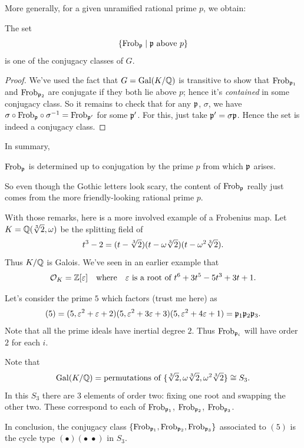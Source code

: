 More generally, for a given unramified rational prime $p$, we obtain:
\begin{theorem}
	The set
	\[ \left\{ \mathrm{Frob}_\mathfrak p \mid \mathfrak p \text{ above } p \right\} \]
	is one of the conjugacy classes of $G$.
\end{theorem}
\begin{proof}
	We've used the fact that $G = \operatorname{Gal}(K/\mathbb Q)$ is transitive
	to show that $\mathrm{Frob}_{\mathfrak p_1}$ and $\mathrm{Frob}_{\mathfrak p_2}$ are conjugate
	if they both lie above $p$; hence it's \emph{contained} in some
	conjugacy class.
	So it remains to check that for any $\mathfrak p$, $\sigma$,
	we have $\sigma \circ \mathrm{Frob}_\mathfrak p \circ \sigma^{-1} = \mathrm{Frob}_{\mathfrak p'}$
	for some $\mathfrak p'$. For this, just take $\mathfrak p' = \sigma\mathfrak p$.
	Hence the set is indeed a conjugacy class.
\end{proof}

In summary,
\begin{moral}
	$\mathrm{Frob}_{\mathfrak p}$ is determined up to conjugation by the prime $p$
	from which $\mathfrak p$ arises.
\end{moral}
So even though the Gothic letters look scary, the content of $\mathrm{Frob}_{\mathfrak p}$
really just comes from the more friendly-looking rational prime $p$.


\begin{example}
	With those remarks, here is a more involved example of a Frobenius map.
	Let $K = \mathbb Q(\sqrt[3]{2}, \omega)$ be the splitting field of
	\[ t^3-2 = (t-\sqrt[3]{2})(t-\omega\sqrt[3]{2})(t-\omega^2\sqrt[3]{2}). \]
	Thus $K/\mathbb Q$ is Galois.
	We've seen in an earlier example that
	\[ \mathcal O_K = \mathbb Z[\varepsilon] \quad\text{where}\quad \varepsilon \text { is a root of } t^6+3t^5-5t^3+3t+1. \]

	Let's consider the prime $5$ which factors (trust me here) as
	\[ (5) = (5, \varepsilon^2+\varepsilon+2)(5, \varepsilon^2+3\varepsilon+3)(5, \varepsilon^2+4\varepsilon+1)
		= \mathfrak p_1 \mathfrak p_2 \mathfrak p_3. \]
	Note that all the prime ideals have inertial degree $2$.
	Thus $\mathrm{Frob}_{\mathfrak p_i}$ will have order $2$ for each $i$.

	Note that
	\[ \operatorname{Gal}(K/\mathbb Q) =
		\text{permutations of } \{\sqrt[3]{2},\omega\sqrt[3]{2},\omega^2\sqrt[3]{2}\}
		\cong S_3.  \]
	In this $S_3$ there are $3$ elements of order two:
	fixing one root and swapping the other two.
	These correspond to each of $\mathrm{Frob}_{\mathfrak p_1}$, $\mathrm{Frob}_{\mathfrak p_2}$, $\mathrm{Frob}_{\mathfrak p_3}$.

	In conclusion, the conjugacy class
	$\left\{ \mathrm{Frob}_{\mathfrak p_1}, \mathrm{Frob}_{\mathfrak p_2}, \mathrm{Frob}_{\mathfrak p_3} \right\}$
	associated to $(5)$ is the
	cycle type $(\bullet)(\bullet \; \bullet)$ in $S_3$.
\end{example}


